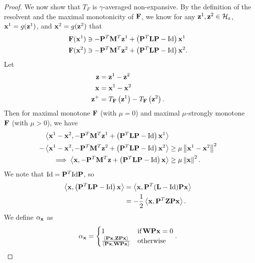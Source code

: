 \begin{proof}
We now show that $T_F$ is $\gamma$-averaged non-expansive.
By the definition of the resolvent and the maximal monotonicity of $\mathbf{F}$, we know for any $\mathbf{z}^1, \mathbf{z}^2 \in \mathcal{H}_\text{z}$, $\mathbf{x}^1 = g(\mathbf{z}^1)$, and $\mathbf{x}^2 = g(\mathbf{z}^2)$ that
\begin{align}
    \mathbf{F}(\mathbf{x}^1) &\ni -\mathbf{P}^T \mathbf{M}^T\mathbf{z}^1 + \left(\mathbf{P}^T \mathbf{L} \mathbf{P} - \mathrm{Id} \right)\mathbf{x}^1 \\
    \mathbf{F}(\mathbf{x}^2) &\ni -\mathbf{P}^T \mathbf{M}^T\mathbf{z}^2 + \left(\mathbf{P}^T \mathbf{L} \mathbf{P} - \mathrm{Id} \right)\mathbf{x}^2.
\end{align}
Let 
\begin{align}
\mathbf{z} &= \mathbf{z}^1 - \mathbf{z}^2\\
\mathbf{x} &= \mathbf{x}^1 - \mathbf{x}^2 \\
\mathbf{z}^+ &= T_{\mathbf{F}}\left(\mathbf{z}^1\right) - T_{\mathbf{F}}\left(\mathbf{z}^2\right).
\end{align}
Then for maximal monotone $\mathbf{F}$ (with $\mu = 0$) and maximal $\mu$-strongly monotone $\mathbf{F}$ (with $\mu > 0$), we have
\begin{align}
    \left\langle \mathbf{x}^1 - \mathbf{x}^2, -\mathbf{P}^T \mathbf{M}^T \mathbf{z}^1 + \left(\mathbf{P}^T \mathbf{L} \mathbf{P}  - \mathrm{Id}\right) \mathbf{x}^1 \right\rangle &\\
    - \left\langle \mathbf{x}^1 - \mathbf{x}^2, -\mathbf{P}^T \mathbf{M}^T \mathbf{z}^2 + \left(\mathbf{P}^T\mathbf{L}\mathbf{P} - \mathrm{Id}\right) \mathbf{x}^2 \right\rangle &\geq \mu \left\lVert\mathbf{x}^1 - \mathbf{x}^2\right\rVert^2\\
    \implies \left\langle \mathbf{x}, -\mathbf{P}^T\mathbf{M}^T \mathbf{z} + \left(\mathbf{P}^T\mathbf{L}\mathbf{P} - \mathrm{Id}\right) \mathbf{x} \right\rangle & \geq \mu \left\lVert\mathbf{x}\right\rVert^2.\label{first}
\end{align}
We note that $\mathrm{Id} = \mathbf{P}^T \mathrm{Id} \mathbf{P}$, so 
\begin{align}
    \left\langle \mathbf{x}, \left(\mathbf{P}^T\mathbf{L}\mathbf{P} - \mathrm{Id}\right) \mathbf{x} \right\rangle &= \left\langle \mathbf{x}, \mathbf{P}^T(\mathbf{L}-\mathrm{Id})\mathbf{P}\mathbf{x} \right\rangle \\
    &= -\frac{1}{2}\left\langle \mathbf{x}, \mathbf{P}^T \mathbf{Z} \mathbf{P} \mathbf{x}\right\rangle.
\end{align}
We define $\alpha_{\mathbf{x}}$ as
\begin{equation}
    \alpha_{\mathbf{x}} = \begin{cases}
        1 \quad &\text{if} \, \mathbf{W}\mathbf{P}\mathbf{x} = 0 \\
        \frac{\left\langle \mathbf{P}\mathbf{x}, \mathbf{Z}\mathbf{P}\mathbf{x} \right\rangle}{\left\langle \mathbf{P}\mathbf{x}, \mathbf{W}\mathbf{P}\mathbf{x}\right\rangle} & \text{otherwise}
    \end{cases}.
\end{equation}

\end{proof}
